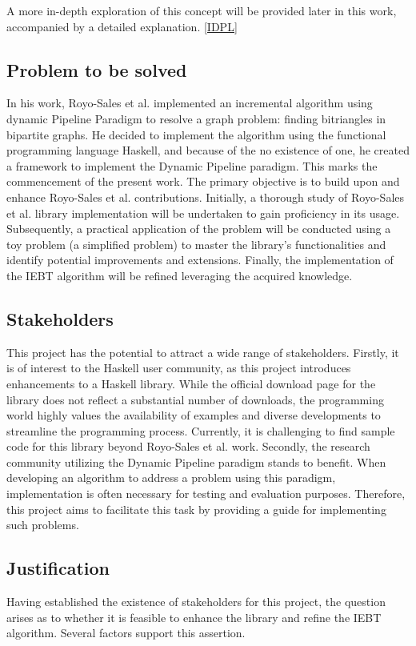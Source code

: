 A more in-depth exploration of this concept will be provided later in this work, accompanied by a detailed explanation. \ref{IDPL}
\subsection{Problem to be solved}
In his work, Royo-Sales et al. \cite{royo_sales_algorithm_2021} implemented an incremental algorithm using dynamic Pipeline Paradigm to resolve a graph problem: finding bitriangles in bipartite graphs.
He decided to implement the algorithm using the functional programming language Haskell, and because of the no existence of one, he created a framework to implement the Dynamic Pipeline paradigm.
This marks the commencement of the present work.
The primary objective is to build upon and enhance Royo-Sales et al. \cite{royo_sales_algorithm_2021} contributions.
Initially, a thorough study of Royo-Sales et al. \cite{royo_sales_algorithm_2021} library implementation will be undertaken to gain proficiency in its usage.
Subsequently, a practical application of the problem will be conducted using a toy problem (a simplified problem) to master the library's functionalities and identify potential improvements and extensions.
Finally, the implementation of the IEBT algorithm will be refined leveraging the acquired knowledge.
\subsection{Stakeholders}
This project has the potential to attract a wide range of stakeholders.
Firstly, it is of interest to the Haskell user community, as this project introduces enhancements to a Haskell library.
While the official download page for the library does not reflect a substantial number of downloads, the programming world highly values the availability of examples and diverse developments to streamline the programming process.
Currently, it is challenging to find sample code for this library beyond Royo-Sales et al. \cite{royo_sales_algorithm_2021} work.
Secondly, the research community utilizing the Dynamic Pipeline paradigm stands to benefit.
When developing an algorithm to address a problem using this paradigm, implementation is often necessary for testing and evaluation purposes.
Therefore, this project aims to facilitate this task by providing a guide for implementing such problems.

\subsection{Justification}
Having established the existence of stakeholders for this project, the question arises as to whether it is feasible to enhance the library and refine the IEBT algorithm.
Several factors support this assertion. \\

